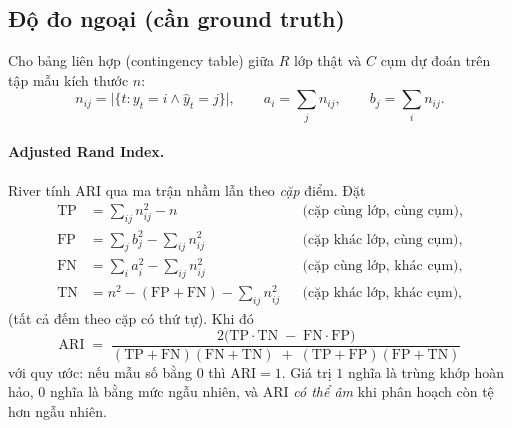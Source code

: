 \documentclass[11pt,a4paper]{article}
\theoremstyle{remark}
\begin{document}
\subsection{Độ đo ngoại (cần ground truth)}
\label{sec:external}

Cho bảng liên hợp (contingency table) giữa $R$ lớp thật và $C$ cụm dự đoán trên
tập mẫu kích thước $n$:
\begin{equation}
  n_{ij} = \big|\{t : y_t = i \wedge \hat y_t = j\}\big|,
  \qquad
  a_i = \sum_j n_{ij},
  \qquad
  b_j = \sum_i n_{ij}.
\end{equation}

\paragraph{Adjusted Rand Index.}
River tính ARI qua ma trận nhầm lẫn theo \emph{cặp} điểm. Đặt
\begin{align}
  \mathrm{TP} &= \textstyle\sum_{ij} n_{ij}^2 - n
    &&\text{(cặp cùng lớp, cùng cụm)},\\
  \mathrm{FP} &= \textstyle\sum_{j} b_j^2 - \sum_{ij} n_{ij}^2
    &&\text{(cặp khác lớp, cùng cụm)},\\
  \mathrm{FN} &= \textstyle\sum_{i} a_i^2 - \sum_{ij} n_{ij}^2
    &&\text{(cặp cùng lớp, khác cụm)},\\
  \mathrm{TN} &= n^2 - (\mathrm{FP}+\mathrm{FN}) - \textstyle\sum_{ij} n_{ij}^2
    &&\text{(cặp khác lớp, khác cụm)},
\end{align}
(tất cả đếm theo cặp có thứ tự). Khi đó
\begin{equation}
  \label{eq:ari}
  \boxed{\;
  \mathrm{ARI} \;=\;
  \frac{2\big(\mathrm{TP}\cdot\mathrm{TN} \;-\; \mathrm{FN}\cdot\mathrm{FP}\big)}
       {(\mathrm{TP}+\mathrm{FN})(\mathrm{FN}+\mathrm{TN})
        \;+\;(\mathrm{TP}+\mathrm{FP})(\mathrm{FP}+\mathrm{TN})}
  \;}
\end{equation}
với quy ước: nếu mẫu số bằng $0$ thì $\mathrm{ARI} = 1$. Giá trị $1$ nghĩa là
trùng khớp hoàn hảo, $0$ nghĩa là bằng mức ngẫu nhiên, và ARI \emph{có thể âm}
khi phân hoạch còn tệ hơn ngẫu nhiên.
\end{document}
